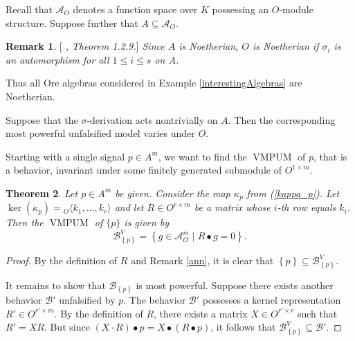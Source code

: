 \documentclass[a4paper,10pt]{article}
\newtheorem{Th}{Theorem}[section]
\newtheorem{remark}[Th]{Remark}
\theoremstyle{nonumberplain}
\newtheorem{proof}{Proof}
\DeclareMathOperator{\VMPUM}{VMPUM}
\begin{document}
Recall that $\mathcal{A}_O $ denotes a function space over $K$ possessing 
an $O$-module structure. Suppose further that $A \subseteq \mathcal{A}_O$.



\begin{remark}\label{noetherian} $[$ \cite{MR}, Theorem 1.2.9.$]$ 
Since $A$ is Noetherian, $O$ is Noetherian if
$\sigma_i$ is an automorphism for all $1\leq i\leq s$ on $A$.
\end{remark}
Thus all Ore algebras considered 
in Example \ref{interestingAlgebras} are Noetherian.

Suppose that the $\sigma$-derivation acts nontrivially on $A$. Then the 
corresponding most powerful unfalsified model varies under $O$.


Starting with a single signal $p \in A^m$, we want to find the $\VMPUM$ of $p$,
that is a behavior, invariant under some finitely generated submodule of $O^{1 \times m}$.


\begin{Th}\label{vmpum} Let $p\in A^m$ be given. Consider the map
$\kappa_p$ from (\ref{kappa_p}).
Let $\ker(\kappa_p)={}_{O} \langle k_1, \dots, k_r \rangle$ 
and let $R \in O^{r \times m}$ be a matrix whose
$i$-th row equals $k_i$. 
Then the $\VMPUM$ of $ \lbrace p \rbrace$ is given by
$$ \mathcal{B}_{\left\lbrace p \right\rbrace }^V=
\left\lbrace g\in \mathcal{A}_O^m \; | \; R \bullet g=0 \right\rbrace. $$
\end{Th}
\begin{proof}
By the definition of $R$ and Remark \ref{ann},  it is clear that 
$\left\lbrace p \right\rbrace \subseteq \mathcal{B}_{\left\lbrace p \right\rbrace }^V $.

It remains to show that $\mathcal{B}_{\left\lbrace p \right\rbrace }$ is most powerful. 
Suppose there exists another behavior $\mathcal{B}'$ unfalsified by $p$. The behavior $\mathcal{B}'$ 
possesses a kernel representation 
$R' \in O^{r' \times m}$.
By the definition of $R$, there exists a matrix $X \in O^{r' \times r}$ such that $R'=XR$. 
But since $(X \cdot R) \bullet p = X \bullet (R \bullet p)$, it follows that 
$\mathcal{B}_{\left\lbrace p \right\rbrace }^V \subseteq \mathcal{B}'$.
\end{proof}
\end{document}
